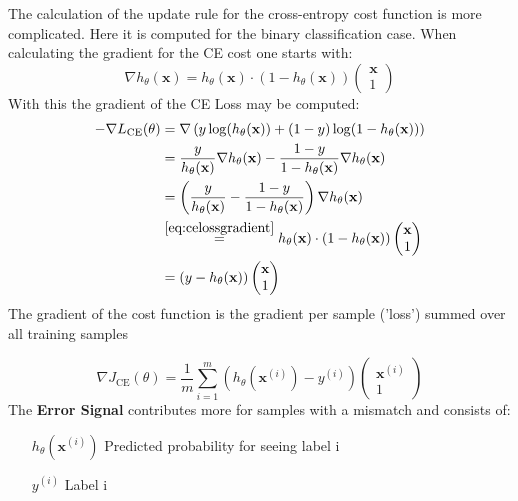 \documentclass[11pt]{article}
\begin{document}
The calculation of the update rule for the cross-entropy cost function is more complicated. Here it is computed for the binary classification case. When calculating the gradient for the CE cost one starts with:
\begin{equation}\label{eq:celossgradient}
	\nabla h_\theta(\textbf{x}) = h_\theta(\textbf{x})\cdot(1-h_\theta(\textbf{x}))\begin{pmatrix}
	\textbf{x}\\
	1
	\end{pmatrix}
\end{equation}
\noindent
With this the gradient of the CE Loss may be computed:
\begin{align*}
	-\nabla L_{\text{CE}}(\theta) &= \nabla\left(y\log(h_\theta(\textbf{x})) + (1-y)\log(1-h_\theta(\textbf{x})) \right)  \\
	&= \frac{y}{h_\theta(\textbf{x})} \nabla h_\theta(\textbf{x}) - \frac{1-y}{1-h_\theta(\textbf{x})}\nabla h_\theta(\textbf{x})\\
	&= \left(\frac{y}{h_\theta(\textbf{x})} - \frac{1-y}{1-h_\theta(\textbf{x})}\right)\nabla h_\theta(\textbf{x})\\
	&\overset{\ref{eq:celossgradient}}{=} h_\theta(\textbf{x})\cdot(1-h_\theta(\textbf{x}))\begin{pmatrix}
	\textbf{x}\\
	1
	\end{pmatrix}\\
	&= (y-h_\theta(\textbf{x}))\begin{pmatrix}
	\textbf{x}\\
	1
	\end{pmatrix}
\end{align*}
\noindent
The gradient of the cost function is the gradient per sample ('loss') summed over all training samples

\begin{equation}
	\nabla J_{\text{CE}} (\theta) = \frac{1}{m}\sum_{i=1}^{m}\left( h_\theta(\textbf{x}^{(i)}) - y^{(i)} \right)\begin{pmatrix}
	\textbf{x}^{(i)}\\
	1
	\end{pmatrix}
\end{equation}
\noindent
The \textbf{Error Signal} contributes more for samples with a mismatch and consists of:
\begin{itemize}[leftmargin=*, labelindent=2cm, labelsep=1cm]
	\item[$h_\theta(\textbf{x}^{(i)})$] Predicted probability for seeing label i
	\item[$y^{(i)}$] Label i
\end{itemize}
\end{document}
